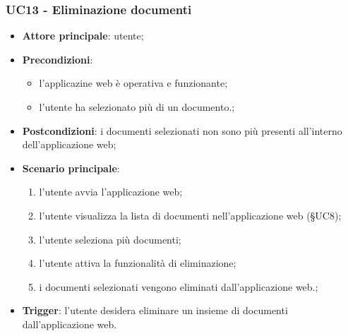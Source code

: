 \documentclass[10pt, a4paper]{article}
\begin{document}
    \subsubsection{UC13 - Eliminazione documenti}
    \begin{itemize}
        \item \textbf{Attore principale}: utente;
        \item \textbf{Precondizioni}: 
        \begin{itemize}
            \item l'applicazine web è operativa e funzionante;
            \item l'utente ha selezionato più di un documento.;
        \end{itemize}
        \item \textbf{Postcondizioni}: i documenti selezionati non sono più presenti all'interno dell'applicazione web;
        \item \textbf{Scenario principale}:
            \begin{enumerate}
                \item l'utente avvia l'applicazione web;
                \item l'utente visualizza la lista di documenti nell'applicazione web (\S UC8);
                \item l'utente seleziona più documenti;
                \item l'utente attiva la funzionalità di eliminazione;
                \item i documenti selezionati vengono eliminati dall'applicazione web.; 
            \end{enumerate}
        \item \textbf{Trigger}: l'utente desidera eliminare un insieme di documenti dall'applicazione web.
    \end{itemize}
\end{document}
